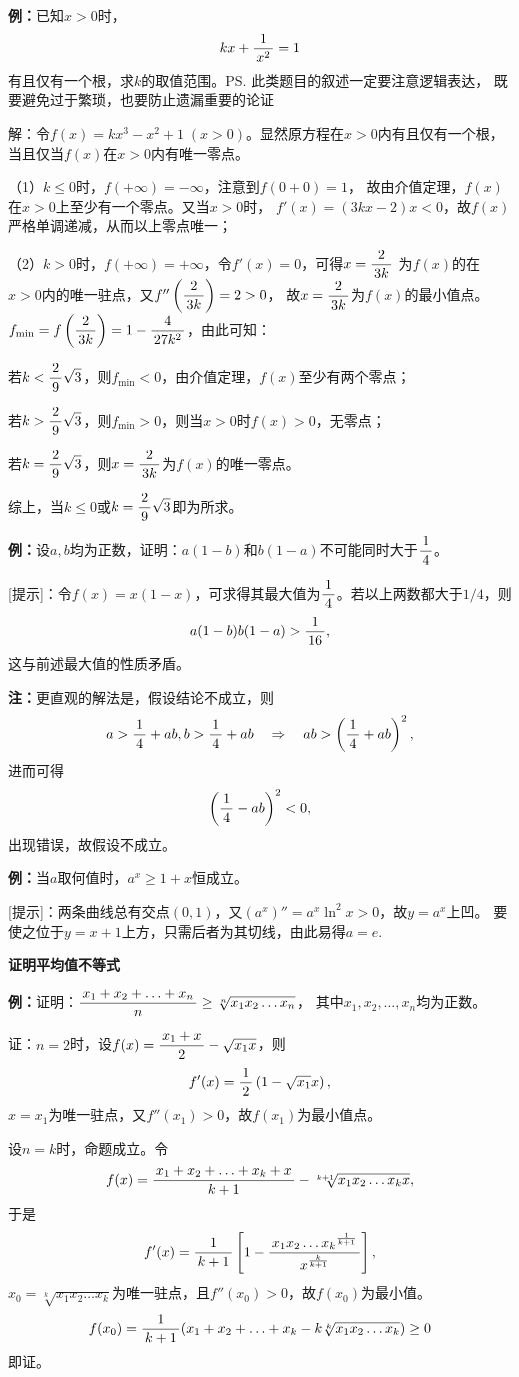 {\bf 例：}已知$x>0$时，
$$kx+\displaystyle\frac{\,{1}\,}{\,{x^2}\,}=1$$
有且仅有一个根，求$k$的取值范围。\ps{此类题目的叙述一定要注意逻辑表达，
既要避免过于繁琐，也要防止遗漏重要的论证}

解：令$f(x)=kx^3-x^2+1\;(x>0)$。显然原方程在$x>0$内有且仅有一个根，
当且仅当$f(x)$在$x>0$内有唯一零点。

（1）$k\leq 0$时，$f(+\infty)=-\infty$，注意到$f(0+0)=1$，
故由介值定理，$f(x)$在$x>0$上至少有一个零点。又当$x>0$时，
$f'(x)=(3kx-2)x<0$，故$f(x)$严格单调递减，从而以上零点唯一；

（2）$k>0$时，$f(+\infty)=+\infty$，令$f'(x)=0$，可得$x=\displaystyle\frac{\,{2}\,}{\,{3k}\,}$
为$f(x)$的在$x>0$内的唯一驻点，又$f''\left(\displaystyle\frac{\,{2}\,}{\,{3k}\,}\right)=2>0$，
故$x=\displaystyle\frac{\,{2}\,}{\,{3k}\,}$为$f(x)$的最小值点。$f_{\min}=f\left(\displaystyle\frac{\,{2}\,}{\,{3k}\,}\right)=1
-\displaystyle\frac{\,{4}\,}{\,{27k^2}\,}$，由此可知：

若$k<\displaystyle\frac{\,{2}\,}{\,{9}\,}\sqrt3$，则$f_{\min}<0$，由介值定理，$f(x)$至少有两个零点；

若$k>\displaystyle\frac{\,{2}\,}{\,{9}\,}\sqrt3$，则$f_{\min}>0$，则当$x>0$时$f(x)>0$，无零点；

若$k=\displaystyle\frac{\,{2}\,}{\,{9}\,}\sqrt3$，则$x=\displaystyle\frac{\,{2}\,}{\,{3k}\,}$为$f(x)$的唯一零点。

综上，当$k\leq 0$或$k=\displaystyle\frac{\,{2}\,}{\,{9}\,}\sqrt3$即为所求。

% 

{\bf 例：}设$a,b$均为正数，证明：$a(1-b)$和$b(1-a)$不可能同时大于$\displaystyle\frac{\,{1}\,}{\,{4}\,}$。

[提示]：令$f(x)=x(1-x)$，可求得其最大值为$\displaystyle\frac{\,{1}\,}{\,{4}\,}$。若以上两数都大于$1/4$，则
$$a(1-b)b(1-a)>\displaystyle\frac{\,{1}\,}{\,{16}\,},$$
这与前述最大值的性质矛盾。

{\bf 注：}更直观的解法是，假设结论不成立，则
$$a>\displaystyle\frac{\,{1}\,}{\,{4}\,}+ab,b>\displaystyle\frac{\,{1}\,}{\,{4}\,}+ab\quad\Rightarrow\quad
ab>\left(\displaystyle\frac{\,{1}\,}{\,{4}\,}+ab\right)^2,$$
进而可得
$$\left(\displaystyle\frac{\,{1}\,}{\,{4}\,}-ab\right)^2<0,$$
出现错误，故假设不成立。

{\bf 例：}当$a$取何值时，$a^x\geq1+x$恒成立。

[提示]：两条曲线总有交点$(0,1)$，又$(a^x)''=a^x\ln^2x>0$，故$y=a^x$上凹。
要使之位于$y=x+1$上方，只需后者为其切线，由此易得$a=e$.

\begin{shaded}
{\bf 证明平均值不等式}

{\bf 例：}证明：$\displaystyle\frac{\,{x_1+x_2+\ldots+x_n}\,}{\,{n}\,}\geq\sqrt[n]{x_1x_2\ldots x_n}$，
其中$x_1,x_2,\ldots,x_n$均为正数。

证：$n=2$时，设$f(x)=\displaystyle\frac{\,{x_1+x}\,}{\,{2}\,}-\sqrt{x_1x}$，则
$$f'(x)=\displaystyle\frac{\,{1}\,}{\,{2}\,}\left(1-\sqrt{x_1}x\right),$$
$x=x_1$为唯一驻点，又$f''(x_1)>0$，故$f(x_1)$为最小值点。

设$n=k$时，命题成立。令
$$f(x)=\displaystyle\frac{\,{x_1+x_2+\ldots+x_k+x}\,}{\,{k+1}\,}-\sqrt[k+1]{x_1x_2\ldots x_kx},$$
于是
$$f'(x)=\displaystyle\frac{\,{1}\,}{\,{k+1}\,}\left[1-\displaystyle\frac{\,{{x_1x_2\ldots x_k}^{\frac1{k+1}}}\,}{\,{x^{\frac k{k+1}}}\,}\right],$$
$x_0=\sqrt[k]{x_1x_2\ldots x_k}$为唯一驻点，且$f''(x_0)>0$，故$f(x_0)$为最小值。
$$f(x_0)=\displaystyle\frac{\,{1}\,}{\,{k+1}\,}(x_1+x_2+\ldots+x_k-k\sqrt[k]{x_1x_2\ldots x_k})\geq 0$$
即证。
\end{shaded}


